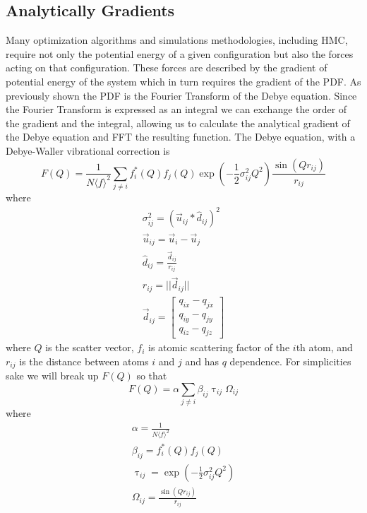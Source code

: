 \subsection{Analytically Gradients}
Many optimization algorithms and simulations methodologies, including HMC, require not only the potential energy of a given configuration but also the forces acting on that configuration.
These forces are described by the gradient of potential energy of the system which in turn requires the gradient of the PDF.
As previously shown the PDF is the Fourier Transform of the Debye equation.
Since the Fourier Transform is expressed as an integral we can exchange the order of the gradient and the integral, allowing us to calculate the analytical gradient of the Debye equation and FFT the resulting function.
The Debye equation, with a Debye-Waller vibrational correction is
\begin{equation}
F(Q) = \frac{1}{N \langle f \rangle^{2}} \sum_{j\neq i} f_i^{*}(Q)f_j(Q) \exp(-\frac{1}{2}\sigma_{ij}^{2}Q^{2}) \frac{\sin(Qr_{ij})}{r_{ij}}
\end{equation}
where
\begin{eqnarray}
  \sigma_{ij}^{2} = (\vec{u}_{ij} * \hat{d}_{ij})^{2}\\
  \vec{u}_{ij} = \vec{u}_{i} - \vec{u}_{j}\\
  \hat{d}_{ij} = \frac{\vec{d}_{ij}}{r_{ij}}\\
  r_{ij} = ||\vec{d}_{ij}|| \\
  \vec{d}_{ij} =
  \begin{bmatrix}
    q_{ix} - q_{jx}\\
    q_{iy} - q_{jy} \\
    q_{iz} - q_{jz}
  \end{bmatrix}
\end{eqnarray}
where $Q$ is the scatter vector, $f_i$ is atomic scattering factor of the $i$th atom, and $r_{ij}$ is the distance between atoms $i$ and $j$ and has $q$ dependence.
For simplicities sake we will break up $F(Q)$ so that
\begin{equation}
F(Q) = \alpha \sum_{j\neq i} \beta_{ij} \uptau_{ij} \Omega_{ij}
\end{equation}
where
\begin{eqnarray}
  \alpha = \frac{1}{N \langle f \rangle^{2}} \\
  \beta_{ij} = f_i^{*}(Q)f_j(Q)\\
  \uptau_{ij} = \exp(-\frac{1}{2}\sigma_{ij}^{2}Q^{2})\\
  \Omega_{ij} = \frac{\sin(Qr_{ij})}{r_{ij}}
\end{eqnarray}

